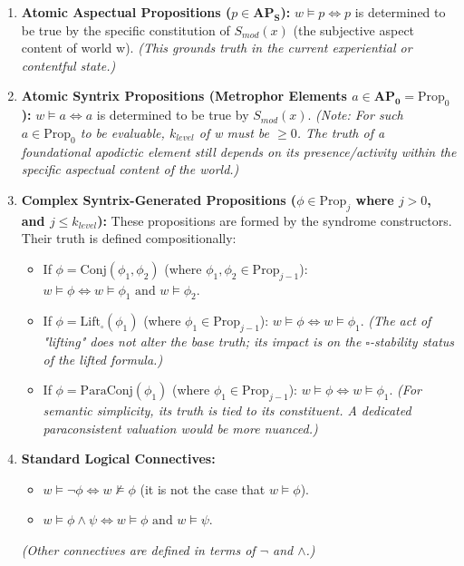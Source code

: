 \documentclass[
    12pt,              %
    a4paper,           %
    headings=normal,   %
    twoside=true,      %
    BCOR=8mm,          %
]{scrbook}
\newcommand{\Smodx}{S_{mod}(x)}
\newcommand{\BoxSyn}{\square}
\newcommand{\APS}{\mathbf{AP_S}}
\newcommand{\APZero}{\mathbf{AP_0}}
\newcommand{\Propk}[1]{\text{Prop}_{#1}}
\begin{document}
\begin{enumerate}[label=\arabic*.]
    \item  \textbf{Atomic Aspectual Propositions (\(p \in \APS\)):}
        \(w \vDash p \iff p\) is determined to be true by the specific constitution of \(\Smodx\) (the subjective aspect content of world w).
        \textit{(This grounds truth in the current experiential or contentful state.)}

    \item  \textbf{Atomic Syntrix Propositions (Metrophor Elements \(a \in \APZero = \Propk{0}\)):}
        \(w \vDash a \iff a\) is determined to be true by \(\Smodx\).
        \textit{(Note: For such \(a \in \Propk{0}\) to be evaluable, \(k_{level}\) of w must be \(\ge 0\). The truth of a foundational apodictic element still depends on its presence/activity within the specific aspectual content of the world.)}

    \item  \textbf{Complex Syntrix-Generated Propositions (\(\phi \in \Propk{j}\) where \(j > 0\), and \(j \le k_{level}\)):}
        These propositions are formed by the syndrome constructors. Their truth is defined compositionally:
        \begin{itemize}
            \item   If \(\phi = \text{Conj}(\phi_1, \phi_2)\) (where \(\phi_1, \phi_2 \in \Propk{j-1}\)):
                \(w \vDash \phi \iff w \vDash \phi_1 \text{ and } w \vDash \phi_2\).
            \item   If \(\phi = \text{Lift}_\BoxSyn(\phi_1)\) (where \(\phi_1 \in \Propk{j-1}\)):
                \(w \vDash \phi \iff w \vDash \phi_1\).
                \textit{(The act of "lifting" does not alter the base truth; its impact is on the \(\BoxSyn\)-stability status of the lifted formula.)}
            \item   If \(\phi = \text{ParaConj}(\phi_1)\) (where \(\phi_1 \in \Propk{j-1}\)):
                \(w \vDash \phi \iff w \vDash \phi_1\).
                \textit{(For semantic simplicity, its truth is tied to its constituent. A dedicated paraconsistent valuation would be more nuanced.)}
        \end{itemize}

    \item  \textbf{Standard Logical Connectives:}
        \begin{itemize}
            \item   \(w \vDash \neg \phi \iff w \nvDash \phi\) (it is not the case that \(w \vDash \phi\)).
            \item   \(w \vDash \phi \land \psi \iff w \vDash \phi \text{ and } w \vDash \psi\).
        \end{itemize}
        \textit{(Other connectives are defined in terms of \(\neg\) and \(\land\).)}


\end{enumerate}
\end{document}
